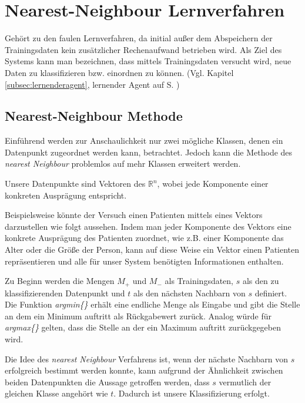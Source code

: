 \documentclass[fontsize=11pt]{scrartcl}
\begin{document}
        \section{Nearest-Neighbour Lernverfahren}
        \label{sec:nnl}
            Gehört zu den faulen Lernverfahren, da initial außer dem Abspeichern der Trainingsdaten kein zusätzlicher Rechenaufwand betrieben wird. Als Ziel des Systems kann man bezeichnen, dass mittels Trainingsdaten versucht wird, neue Daten zu klassifizieren bzw. einordnen zu können. (Vgl. Kapitel \ref{subsec:lernenderagent}, lernender Agent auf S. \pageref{subsec:lernenderagent})
                        
            \subsection{Nearest-Neighbour Methode}
            \label{subsec:nn-methode}
                Einführend werden zur Anschaulichkeit nur zwei mögliche Klassen, denen ein Datenpunkt zugeordnet werden kann, betrachtet. Jedoch kann die Methode des \emph{nearest Neighbour} problemlos auf mehr Klassen erweitert werden.\par
                Unsere Datenpunkte sind Vektoren des $\mathbb{R}^n$, wobei jede Komponente einer konkreten Ausprägung entspricht.\par
                Beispielsweise könnte der Versuch einen Patienten mittels eines Vektors darzustellen wie folgt aussehen. Indem man jeder Komponente des Vektors eine konkrete Ausprägung des Patienten zuordnet, wie z.B. einer Komponente das Alter oder die Größe der Person, kann auf diese Weise ein Vektor einen Patienten repräsentieren und alle für unser System benötigten Informationen enthalten.\par
                Zu Beginn werden die Mengen $M_+$ und $M_-$ als Trainingsdaten, $s$ als den zu klassifizierenden Datenpunkt und $t$ als den nächsten Nachbarn von $s$ definiert. Die Funktion \emph{argmin\{\}} erhält eine endliche Menge als Eingabe und gibt die Stelle an dem ein Minimum auftritt als Rückgabewert zurück. Analog würde für \emph{argmax\{\}} gelten, dass die Stelle an der ein Maximum auftritt zurückgegeben wird.\par
                        
                Die Idee des \emph{nearest Neighbour} Verfahrens ist, wenn der nächste Nachbarn von $s$ erfolgreich bestimmt werden konnte, kann aufgrund der Ähnlichkeit zwischen beiden Datenpunkten die Aussage getroffen werden, dass $s$ vermutlich der gleichen Klasse angehört wie $t$. Dadurch ist unsere Klassifizierung erfolgt.
               
\end{document}
